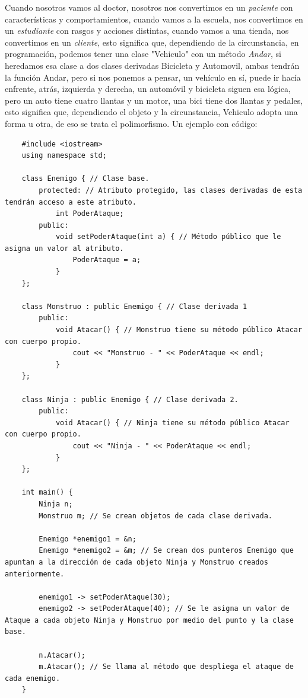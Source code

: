 Cuando nosotros vamos al doctor, nosotros nos convertimos en un \textit{paciente} con características y comportamientos, cuando vamos a la escuela, nos convertimos en un \textit{estudiante} con rasgos y acciones distintas, cuando vamos a una tienda, nos convertimos en un \textit{cliente}, esto significa que, dependiendo de la circunstancia, en programación, podemos tener una clase "Vehiculo" con un método \textit{Andar}, si heredamos esa clase a dos clases derivadas Bicicleta y Automovil, ambas tendrán la función Andar, pero si nos ponemos a pensar, un vehículo en sí, puede ir hacía enfrente, atrás, izquierda y derecha, un automóvil y bicicleta siguen esa lógica, pero un auto tiene cuatro llantas y un motor, una bici tiene dos llantas y pedales, esto significa que, dependiendo el objeto y la circunstancia, Vehiculo adopta una forma u otra, de eso se trata el polimorfismo. Un ejemplo con código:
\begin{lstlisting}
    #include <iostream>
    using namespace std;
    
    class Enemigo { // Clase base.
        protected: // Atributo protegido, las clases derivadas de esta tendrán acceso a este atributo.
            int PoderAtaque;
        public:
            void setPoderAtaque(int a) { // Método público que le asigna un valor al atributo.
                PoderAtaque = a;
            }
    };
    
    class Monstruo : public Enemigo { // Clase derivada 1
        public:
            void Atacar() { // Monstruo tiene su método público Atacar con cuerpo propio.
                cout << "Monstruo - " << PoderAtaque << endl;
            }
    };
    
    class Ninja : public Enemigo { // Clase derivada 2.
        public:
            void Atacar() { // Ninja tiene su método público Atacar con cuerpo propio.
                cout << "Ninja - " << PoderAtaque << endl;
            }
    };
    
    int main() {
        Ninja n;
        Monstruo m; // Se crean objetos de cada clase derivada.
        
        Enemigo *enemigo1 = &n;
        Enemigo *enemigo2 = &m; // Se crean dos punteros Enemigo que apuntan a la dirección de cada objeto Ninja y Monstruo creados anteriormente.
        
        enemigo1 -> setPoderAtaque(30);
        enemigo2 -> setPoderAtaque(40); // Se le asigna un valor de Ataque a cada objeto Ninja y Monstruo por medio del punto y la clase base.
        
        n.Atacar();
        m.Atacar(); // Se llama al método que despliega el ataque de cada enemigo.
    }
\end{lstlisting}

